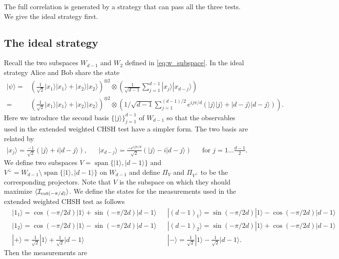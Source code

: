 \documentclass[11pt,letterpaper]{article}
\newcommand{\ket}[1]{|#1\rangle}
\newcommand{\x}{\otimes}
\DeclarePairedDelimiter{\ip}{\langle}{\rangle}
\DeclareMathOperator{\spn}{span}
\newcommand{\1}{\mathbb{1}}
\newcommand{\I}{\mathcal{I}}
\theoremstyle{definition}
\begin{document}
The full correlation is generated by a strategy that can pass all the three tests. We give the ideal strategy first.
\subsection{The ideal strategy}
Recall the two subspaces $W_{d-1}$ and $W_2$ defined in \cref{eq:w_subspace}. 
In the ideal strategy Alice and Bob share the state 
\begin{align*}
\ket{\psi} = &(\frac{1}{\sqrt{2}} \ket{x_1}\ket{x_1} + \ket{x_2}\ket{x_2})^{\x 2} \x \left(\frac{1}{\sqrt{d-1}} \sum_{j=1}^{d-1} \ket{x_j}\ket{x_{d-j}}\right)\\
=&(\frac{1}{\sqrt{2}} \ket{x_1}\ket{x_1} + \ket{x_2}\ket{x_2})^{\x 2} \x \left(1/\sqrt{d-1} \sum_{j=1}^{(d-1)/2} e^{ij\pi/d}(\ket{j}\ket{j} + \ket{d-j}\ket{d-j})\right).
\end{align*}
Here we introduce the second basis $\{ \ket{j} \}_{j=1}^{d-1}$ of $W_{d-1}$ so that
the observables used in the extended weighted CHSH test have a simpler form.
The two basis are related by
\begin{align*}
	\ket{x_j} = \frac{-1}{\sqrt{2}}(\ket{j} + i\ket{d-j}), &&
	\ket{x_{d-j}} = \frac{-e^{ij\pi/d}}{\sqrt{2}}(\ket{j} - i\ket{d-j}) && \text{for } j = 1 \dots \frac{d-1}{2}.
\end{align*}
We define two subspaces $V = \spn\{\ket{1}, \ket{d-1}\}$ and $V^\perp = W_{d-1} \setminus\spn\{\ket{1}, \ket{d-1}\}$ on
$W_{d-1}$ and
define $\Pi_V$ and $\Pi_{V^\perp}$ to be the corresponding projectors. Note that $V$ is the subspace on which they should maximize $\ip{\I_{\cot(-\pi/d)}}$.
We define the states for the measurements used in the extended weighted CHSH test as follows
\begin{align*}
	&\ket{1_1} = \cos(-\pi/2d)\ket{1} + \sin(-\pi/2d)\ket{d-1}
	&&\ket{(d-1)_1} = \sin(-\pi/2d)\ket{1} - \cos(-\pi/2d)\ket{d-1}\\
	&\ket{1_2} = \cos(-\pi/2d)\ket{1} - \sin(-\pi/2d)\ket{d-1}
	&&\ket{(d-1)_2} = \sin(-\pi/2d)\ket{1} + \cos(-\pi/2d)\ket{d-1}\\
	&\ket{+} = \frac{1}{\sqrt{2}}\ket{1} + \frac{1}{\sqrt{2}}\ket{d-1}
	&&\ket{-} = \frac{1}{\sqrt{2}}\ket{1} - \frac{1}{\sqrt{2}}\ket{d-1}.
\end{align*}
Then the measurements are
\end{document}
